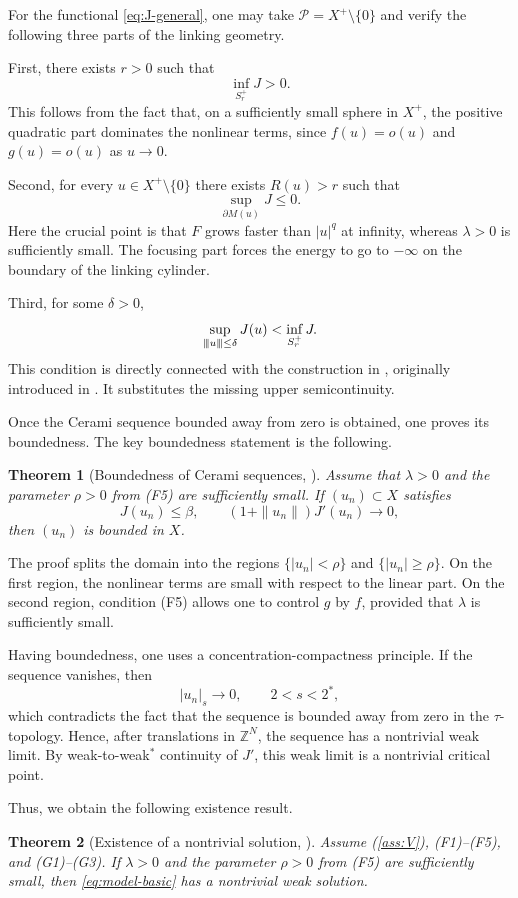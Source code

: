 \documentclass[10pt,a4paper]{amsart}
\numberwithin{equation}{section}
\newtheorem{theorem}{Theorem}[section]
\newcommand{\Z}{\mathbb{Z}}
\newcommand{\cP}{\mathcal{P}}
\newcommand{\vertiii}[1]{{\left\vert\kern-0.25ex\left\vert\kern-0.25ex\left\vert #1 \right\vert\kern-0.25ex\right\vert\kern-0.25ex\right\vert}}
\begin{document}
For the functional \eqref{eq:J-general}, one may take
$\cP=X^+\setminus\{0\}$ and verify the following three parts of the
linking geometry.

First, there exists $r>0$ such that
\[
\inf_{S_r^+}J>0.
\]
This follows from the fact that, on a sufficiently small sphere in $X^+$,
the positive quadratic part dominates the nonlinear terms, since
$f(u)=o(u)$ and $g(u)=o(u)$ as $u\to0$.

Second, for every $u\in X^+\setminus\{0\}$ there exists $R(u)>r$ such
that
\[
\sup_{\partial M(u)}J\le0.
\]
Here the crucial point is that $F$ grows faster than $|u|^q$ at infinity,
whereas $\lambda>0$ is sufficiently small. The focusing part forces the
energy to go to $-\infty$ on the boundary of the linking cylinder.

Third, for some $\delta>0$,
\[
\sup_{\vertiii{u}\le\delta}J(u)<\inf_{S_r^+}J.
\]
This condition is directly connected with the construction in
\cite{BB2022}, originally introduced in \cite{ChenWang}. It substitutes the missing upper semicontinuity.

Once the Cerami sequence bounded away from zero is obtained, one proves
its boundedness. The key boundedness statement is the following.

\begin{theorem}[Boundedness of Cerami sequences, {\cite[Proposition 5.2]{BB2022}}]
Assume that $\lambda>0$ and the parameter $\rho>0$ from (F5) are
sufficiently small. If $(u_n)\subset X$ satisfies
\[
J(u_n)\le\beta,\qquad
(1+\|u_n\|)J'(u_n)\to0,
\]
then $(u_n)$ is bounded in $X$.
\end{theorem}

The proof splits the domain into the regions $\{|u_n|<\rho\}$ and
$\{|u_n|\ge\rho\}$. On the first region, the nonlinear terms are small
with respect to the linear part. On the second region, condition (F5)
allows one to control $g$ by $f$, provided that $\lambda$ is sufficiently
small.

Having boundedness, one uses a concentration-compactness principle. If the sequence vanishes, then
\[
|u_n|_s\to0,\qquad 2<s<2^*,
\]
which contradicts the fact that the sequence is bounded away from zero in
the $\tau$-topology. Hence, after translations in $\Z^{N}$, the sequence
has a nontrivial weak limit. By weak-to-weak$^*$ continuity of $J'$, this
weak limit is a nontrivial critical point.

Thus, we obtain the following existence result.

\begin{theorem}[Existence of a nontrivial solution, {\cite[Theorem 1.2]{BB2022}}]\label{thm:BB-existence}
Assume (\ref{ass:V}), (F1)--(F5), and (G1)--(G3). If $\lambda>0$ and the
parameter $\rho>0$ from (F5) are sufficiently small, then
\eqref{eq:model-basic} has a nontrivial weak solution.
\end{theorem}
\end{document}
